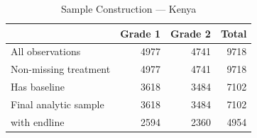 \begin{table}[htbp]
\centering
\small
\caption{Sample Construction --- Kenya}
\label{tab:ke_sampleflow}
\begin{tabular}{l*{3}{r}}
\toprule
 & Grade 1 & Grade 2 & Total \\
\midrule
All observations & 4977 & 4741 & 9718 \\
Non-missing treatment & 4977 & 4741 & 9718 \\
Has baseline & 3618 & 3484 & 7102 \\
Final analytic sample & 3618 & 3484 & 7102 \\
\quad with endline & 2594 & 2360 & 4954 \\
\bottomrule
\end{tabular}
\end{table}